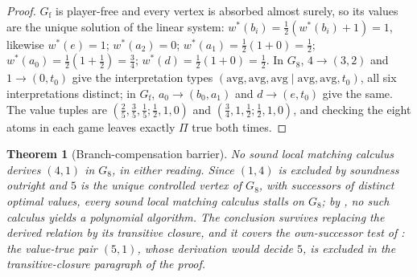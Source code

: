 \documentclass[11pt]{article}
\theoremstyle{plain}
\newtheorem{theorem}{Theorem}[section]
\theoremstyle{definition}
\begin{document}
\begin{proof}
$G_{\mathrm{f}}$ is player-free and every vertex is absorbed almost surely, so
its values are the unique solution of the linear system:
$w^\ast(b_i)=\tfrac12(w^\ast(b_i)+1)=1$, likewise $w^\ast(e)=1$;
$w^\ast(a_2)=0$; $w^\ast(a_1)=\tfrac12(1+0)=\tfrac12$;
$w^\ast(a_0)=\tfrac12(1+\tfrac12)=\tfrac34$;
$w^\ast(d)=\tfrac12(1+0)=\tfrac12$. In $G_8$, $4\to(3,2)$ and
$1\to(0,t_0)$ give the interpretation types
$(\mathrm{avg},\mathrm{avg},\mathrm{avg}\mid\mathrm{avg},\mathrm{avg},t_0)$,
all six interpretations distinct; in $G_{\mathrm{f}}$, $a_0\to(b_0,a_1)$ and
$d\to(e,t_0)$ give the same. The value tuples are
$(\tfrac25,\tfrac35,\tfrac15;\tfrac12,1,0)$ and
$(\tfrac34,1,\tfrac12;\tfrac12,1,0)$, and checking the eight atoms in
each game leaves exactly $\Pi$ true both times.
\end{proof}

\begin{theorem}[Branch-compensation barrier]\label{thm:matching-barrier}
No sound local matching calculus derives $(4,1)$ in $G_8$, in either
reading. Since $(1,4)$ is excluded by soundness outright and $5$ is the
unique controlled vertex of $G_8$, with successors of distinct optimal
values, \emph{every} sound local matching calculus stalls on $G_8$; by
, no such calculus yields a polynomial
algorithm. The conclusion survives replacing the derived relation by its
transitive closure, and it covers the own-successor test of
: the value-true pair $(5,1)$, whose derivation
would decide $5$, is excluded in the transitive-closure paragraph of the
proof.
\end{theorem}
\end{document}
